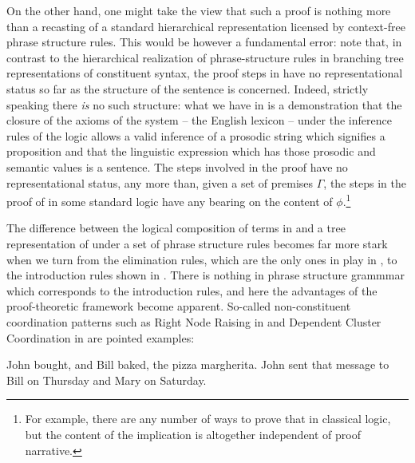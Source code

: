 \documentclass[output=paper,colorlinks,citecolor=brown]{langscibook}
\begin{document}
On the other hand, one might take the view that such a proof is
nothing more than a recasting of a standard hierarchical
representation licensed by context-free phrase structure rules. This
would be however a fundamental error: note that, in contrast to the
hierarchical realization of phrase-structure rules in branching tree
representations of constituent syntax, the proof steps in 
have no representational status so far as the structure of the
sentence is concerned. Indeed, strictly speaking there \textit{is} no
such structure: what we have in  is a demonstration that
the closure of the axioms of the system -- the English lexicon -- under
the inference rules of the logic allows a valid inference of a prosodic
string
 
which signifies a proposition
 and that the
linguistic expression which has those prosodic and semantic values is
a sentence. The steps involved in the proof have no representational
status, any more than, given a set of premises $\Gamma$, the steps in
the proof of \sem{ \Gamma  \ensuremath{\vdash\xspace } \phi } in some standard logic have any
bearing on the content of $\phi$.\footnote{For example, there are any
number of ways to prove that \sem{\ensuremath{\vdash\xspace } \phi\supset(\neg\phi\supset\psi)}
in classical logic, but the content of the implication is
altogether independent of proof narrative.}

The difference between the logical composition of terms in  and
a tree representation of  under a set of phrase structure rules
becomes far more stark when we turn from the elimination rules, which
are the only ones in play in , to the introduction rules
shown in . There is nothing in phrase structure grammmar which
corresponds to the introduction rules, and here the advantages of the
proof-theoretic framework become apparent. So-called non-constituent
coordination patterns such as Right Node Raising in  and
Dependent Cluster Coordination in  are pointed examples:

\begin{exe}
\ex\label{NCC}
\begin{xlist}
 \ex\label{RNR} John bought, and Bill baked, the pizza margherita.
 \ex\label{DCC} John sent that message to Bill on Thursday and Mary on Saturday.
\end{xlist}
\end{exe}
\end{document}

